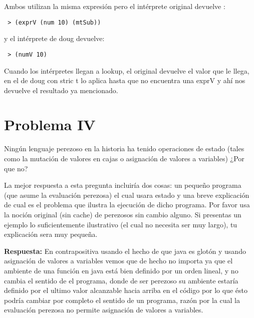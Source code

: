 \documentclass[12pt]{article}
\begin{document}
Ambos utilizan la misma expresión pero el intérprete original devuelve :
\begin{verbatim}
 > (exprV (num 10) (mtSub))
 \end{verbatim}
y el intérprete de doug devuelve:
\begin{verbatim}
 > (numV 10)
 \end{verbatim} 
Cuando los intérpretes llegan a lookup, el original devuelve el valor que le llega, en el de doug con stric t lo aplica hasta que no encuentra una exprV y ahí nos devuelve el resultado ya mencionado.


\section*{Problema IV}
Ningún lenguaje perezoso en la historia ha tenido operaciones de estado (tales
como la mutación de valores en cajas o asignación de valores a variables) ¿Por
que no?

La mejor respuesta a esta pregunta incluiría dos cosas: un pequeño programa (que
asume la evaluación perezosa) el cual usara estado y una breve explicación de cual
es el problema que ilustra la ejecución de dicho programa. Por favor usa la
noción original (sin cache) de perezosos sin cambio alguno. Si presentas un
ejemplo lo suficientemente ilustrativo (el cual no necesita ser muy largo), tu
explicación sera muy pequeña.

\textbf{Respuesta: } En contrapositiva usando el hecho de que java es glotón y usando asignación de valores a variables vemos que de hecho no importa ya que el ambiente de una función en java está bien definido por un orden lineal, y no cambia el sentido de el programa, donde de ser perezoso su ambiente estaría definido por el ultimo valor alcanzable hacia arriba en el código por lo que ésto podría cambiar por completo el sentido de un programa, razón por la cual la evaluación perezosa no permite asignación de valores a variables.
\end{document}
